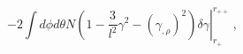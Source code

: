 \begin{equation}
\left. -2 \int d\phi d\theta N \left(1-\frac{3}{l^2}\gamma^2 -
(\gamma_{,\rho})^2 \right)  \delta \gamma \right|^{r_{++}}_{r_+}  \ ,
\label{var2}
\end{equation}

